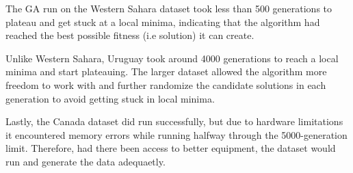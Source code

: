 The GA run on the Western Sahara dataset took less than 
500 generations to plateau and get stuck at a local minima, 
indicating that the algorithm had reached the best possible 
fitness (i.e solution) it can create. 

Unlike Western Sahara, Uruguay took around 4000 generations 
to reach a local minima and start plateauing. The larger 
dataset allowed the algorithm more freedom to work with and 
further randomize the candidate solutions in each generation 
to avoid getting stuck in local minima. 

Lastly, the Canada dataset did run successfully, but due to 
hardware limitations it encountered memory errors while running 
halfway through the 5000-generation limit. Therefore, had there 
been access to better equipment, the dataset would run and 
generate the data adequaetly.
